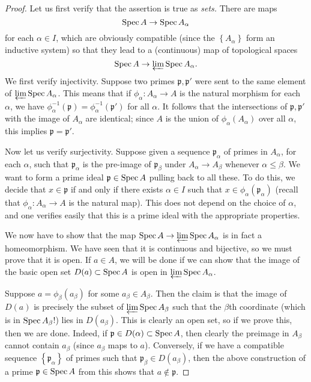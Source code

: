 \begin{proof} 
Let us first verify that the assertion is true as \emph{sets.} There are maps
\[ \operatorname{Spec} A \to \operatorname{Spec} A_\alpha  \]
for each $\alpha \in I$, which are obviously compatible (since the
$\left\{A_\alpha\right\}$ form an inductive system) so that they lead to a
(continuous) map of topological spaces
\[ \operatorname{Spec} A \to \varprojlim \operatorname{Spec} A_\alpha.  \]
We first verify injectivity. Suppose two primes $\mathfrak{p}, \mathfrak{p}'$ were sent to the same element
of $\varprojlim \operatorname{Spec} A_\alpha$. This means that if $\phi_\alpha: A_\alpha \to
A$ is the natural morphism for each $\alpha$, we have
$\phi_\alpha^{-1}(\mathfrak{p}) = \phi_\alpha^{-1}(\mathfrak{p}')$ for all
$\alpha$. It follows that the intersections of $\mathfrak{p}, \mathfrak{p}'$
with the image of $A_\alpha$ are identical; since $A$ is the union of
$\phi_\alpha(A_\alpha)$ over all $\alpha$, this implies $\mathfrak{p} =
\mathfrak{p}'$.

Now let us verify surjectivity. Suppose given a sequence $\mathfrak{p}_\alpha$
of primes in $A_\alpha$, for each $\alpha$, such that $\mathfrak{p}_\alpha$ is
the pre-image of $\mathfrak{p}_\beta$ under $A_\alpha \to A_\beta$ whenever
$\alpha \leq \beta$. We want to form a prime ideal $\mathfrak{p} \in \operatorname{Spec} A$
pulling back to all these. To do this, we decide that $x \in \mathfrak{p}$ if
and only if there exists $\alpha \in I$ such that $x \in
\phi_\alpha(\mathfrak{p}_\alpha)$ (recall that $\phi_\alpha: A_\alpha \to A$
is the natural map). This does not depend on the choice of $\alpha$, and one
verifies easily that this is a prime ideal with the appropriate properties.

We now have to show that the map $\operatorname{Spec} A \to \varprojlim \operatorname{Spec} A_\alpha$ is
in fact a homeomorphism. We have seen that it is continuous and bijective, so
we must prove that it is open. If $a \in A$, we will be done if we can show
that the image of the basic open set $D(a) \subset \operatorname{Spec} A$ is open in
$\varprojlim \operatorname{Spec} A_\alpha$.

Suppose $a = \phi_\beta(a_\beta)$ for some $a_\beta \in A_\beta$. Then the
claim is that the image of $D(a)$ is precisely the subset of $\varprojlim
\operatorname{Spec} A_\beta$ such that the $\beta$th coordinate (which is in $\operatorname{Spec} A_\beta$!)
lies in $D(a_\beta)$. This is clearly an open set, so if we prove this, then
we are done. Indeed, if $\mathfrak{p} \in D(\alpha) \subset \operatorname{Spec} A$,
then clearly the preimage in $A_\beta$ cannot contain $a_\beta$ (since
$a_\beta$ maps to $a$). Conversely, if we have a compatible sequence
$\left\{\mathfrak{p}_\alpha\right\}$ of primes  such that $\mathfrak{p}_\beta
\in D(a_\beta)$, then the above construction of a prime $\mathfrak{p} \in
\operatorname{Spec} A$ from this shows that $a \notin \mathfrak{p}$. 
\end{proof} 
